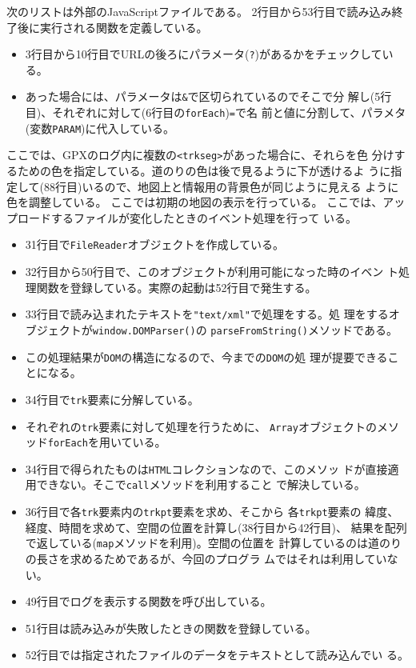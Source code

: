  次のリストは外部のJavaScriptファイルである。
 2行目から53行目で読み込み終了後に実行される関数を定義している。
 \begin{itemize}
	\item 3行目から10行目でURLの後ろにパラメータ(\Verb+?+)があるかをチェックしている。
	\item あった場合には、パラメータは\Verb+&+で区切られているのでそこで分
				解し(5行目)、それぞれに対して(6行目の\Verb+forEach+)\Verb+=+で名
				前と値に分割して、パラメタ(変数\Verb+PARAM+)に代入している。
 \end{itemize}
 ここでは、GPXのログ内に複数の\Verb+<trkseg>+があった場合に、それらを色
 分けするための色を指定している。道のりの色は後で見るように下が透けるよ
 うに指定して(88行目)いるので、地図上と情報用の背景色が同じように見える
 ように色を調整している。
 ここでは初期の地図の表示を行っている。
 ここでは、アップロードするファイルが変化したときのイベント処理を行って
 いる。
 \begin{itemize}
	\item 31行目で\Verb+FileReader+オブジェクトを作成している。
	\item 32行目から50行目で、このオブジェクトが利用可能になった時のイベン
				ト処理関数を登録している。実際の起動は52行目で発生する。
	\item 33行目で読み込まれたテキストを\Verb+"text/xml"+で処理をする。処
				理をするオブジェクトが\Verb+window.DOMParser()+の
				\Verb+parseFromString()+メソッドである。
	\item この処理結果が\Verb+DOM+の構造になるので、今までの\Verb+DOM+の処
				理が提要できることになる。
	\item 34行目で\texttt{trk}要素に分解している。
	\item それぞれの\texttt{trk}要素に対して処理を行うために、
				\texttt{Array}オブジェクトのメソッド\texttt{forEach}を用いている。
	\item 34行目で得られたものは\texttt{HTML}コレクションなので、このメソッ
				ドが直接適用できない。{そこで}\texttt{call}メソッドを利用すること
				で解決している。
	\item 36行目で各\texttt{trk}要素内の\texttt{trkpt}要素を求め、そこから
				各\texttt{trkpt}要素の
				緯度、経度、時間を求めて、空間の位置を計算し(38行目から42行目)、
				結果を配列で返している(\texttt{map}メソッドを利用)。空間の位置を
				計算しているのは道のりの長さを求めるためであるが、今回のプログラ
				ムではそれは利用していない。
	\item 49行目でログを表示する関数を呼び出している。
	\item 51行目は読み込みが失敗したときの関数を登録している。
	\item 52行目では指定されたファイルのデータをテキストとして読み込んでい
				る。
 \end{itemize}
